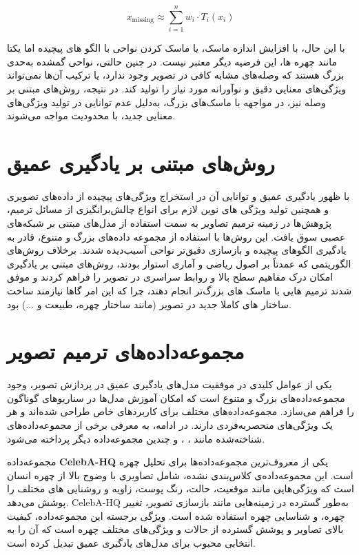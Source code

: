  $$
 x_{\text{missing}} \approx \sum_{i=1}^{n} w_i \cdot T_i(x_i)
 $$


با این حال، با افزایش اندازه ماسک، یا ماسک کردن نواحی با الگو های پیچیده اما یکتا مانند چهره ها، این فرضیه دیگر معتبر نیست. در چنین حالتی، نواحی گمشده به‌حدی بزرگ هستند که وصله‌های مشابه کافی در تصویر وجود ندارد، یا ترکیب آن‌ها نمی‌تواند ویژگی‌های معنایی دقیق و نوآورانه مورد نیاز را تولید کند. در نتیجه، روش‌های مبتنی بر وصله نیز، در مواجهه با ماسک‌های بزرگ، به‌دلیل عدم توانایی در تولید ویژگی‌های معنایی جدید، با محدودیت مواجه می‌شوند.

\section{روش‌های مبتنی بر یادگیری عمیق}

با ظهور یادگیری عمیق و توانایی آن در استخراج ویژگی‌های پیچیده از داده‌های تصویری و همچنین تولید ویژگی های نوین لازم برای انواع چالش‌برانگیزی از مسائل ترمیم، پژوهش‌ها در زمینه ترمیم تصاویر به سمت استفاده از مدل‌های مبتنی بر شبکه‌های عصبی سوق یافت. این روش‌ها با استفاده از مجموعه داده‌های بزرگ و متنوع، قادر به یادگیری الگوهای پیچیده و بازسازی دقیق‌تر نواحی آسیب‌دیده شدند. برخلاف روش‌های الگوریتمی که عمدتاً بر اصول ریاضی و آماری استوار بودند، روش‌های مبتنی بر یادگیری امکان درک مفاهیم سطح بالا و روابط سراسری در تصویر را فراهم کردند و موفق شدند ترمیم هایی با  ماسک های بزرگ‌تر انجام دهند، چرا که این امر گاها نیازمند ساخت ساختار های کاملا جدید در تصویر (مانند ساختار چهره، طبیعت و ...) بود. 

\section{مجموعه‌داده‌های ترمیم تصویر}

یکی از عوامل کلیدی در موفقیت مدل‌های یادگیری عمیق در پردازش تصویر، وجود مجموعه‌داده‌های بزرگ و متنوع است که امکان آموزش مدل‌ها در سناریوهای گوناگون را فراهم می‌سازد. مجموعه‌داده‌های مختلف برای کاربردهای خاص طراحی شده‌اند و هر یک ویژگی‌های منحصربه‌فردی دارند. در ادامه، به معرفی برخی از مجموعه‌داده‌های شناخته‌شده مانند ، ، و چندین مجموعه‌داده دیگر پرداخته می‌شود.


مجموعه‌داده \textbf{CelebA-HQ} یکی از معروف‌ترین مجموعه‌داده‌ها برای تحلیل چهره است. این مجموعه‌داده‌ی کلاس‌بندی نشده، شامل تصاویری با وضوح بالا از چهره انسان است که ویژگی‌هایی مانند موقعیت، حالت، رنگ پوست، زاویه و روشنایی های مختلف را پوشش می‌دهد. CelebA-HQ به‌طور گسترده در زمینه‌هایی مانند بازسازی تصویر، تغییر چهره، و شناسایی چهره استفاده شده است. ویژگی برجسته این مجموعه‌داده، کیفیت بالای تصاویر و پوشش گسترده از حالات و ویژگی‌های مختلف چهره است که آن را به انتخابی محبوب برای مدل‌های یادگیری عمیق تبدیل کرده است.

